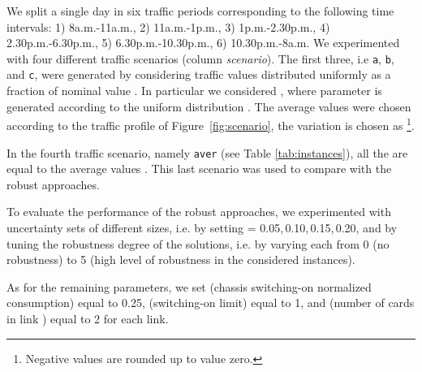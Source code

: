 \documentclass[final,5p,times,twocolumn]{elsarticle}
\begin{document}
We split a single day in six traffic periods corresponding to the following time intervals: 1) 8a.m.-11a.m., 2) 11a.m.-1p.m., 3) 1p.m.-2.30p.m., 4) 2.30p.m.-6.30p.m., 5) 6.30p.m.-10.30p.m., 6) 10.30p.m.-8a.m.
We experimented with four different traffic scenarios (column \emph{scenario}). The first three, i.e {\tt a}, {\tt b}, and {\tt c}, were generated by considering traffic values  distributed uniformly as a fraction  of nominal value . In particular we considered , where parameter  is generated according to the uniform distribution . The average values  were chosen according to the traffic profile of Figure~\ref{fig:scenario}, the variation  is chosen as \footnote{Negative values are rounded up to value zero.}. 
 
In the fourth traffic scenario, namely {\tt aver} (see Table \ref{tab:instances}), all the  are equal to the average values . This last scenario was used to compare with the robust approaches. 

To evaluate the performance of the robust approaches, we experimented with uncertainty sets of different sizes, i.e. by setting  = 0.05,\,0.10,\,0.15,\,0.20, and by tuning the robustness degree of the solutions, i.e. by varying each  from 0 (no robustness) to 5 (high level of robustness in the considered instances).

As for the remaining parameters, we set  (chassis switching-on normalized consumption) equal to 0.25,  (switching-on limit) equal to 1, and  (number of cards in link ) equal to 2 for each link.
\end{document}
